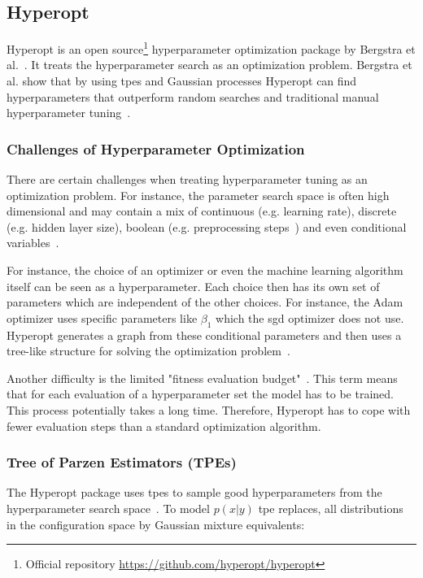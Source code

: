 \subsection{Hyperopt}

Hyperopt is an open source\footnote{Official repository \url{https://github.com/hyperopt/hyperopt}} hyperparameter optimization package by Bergstra et al.~\cite{Bergstra2013a}. It treats the hyperparameter search as an optimization problem. Bergstra et al. show that by using \glspl{tpe} and Gaussian processes Hyperopt can find hyperparameters that outperform random searches and traditional manual hyperparameter tuning~\cite{Bergstra2011}.




\subsubsection*{Challenges of Hyperparameter Optimization}

There are certain challenges when treating hyperparameter tuning as an optimization problem. For instance, the parameter search space is often high dimensional and may contain a mix of continuous {(e.g. learning rate)}, discrete {(e.g. hidden layer size)}, boolean {(e.g. preprocessing steps~\cite{Hutter2009})} and even conditional variables~\cite{Bergstra2013}. 

For instance, the choice of an optimizer or even the machine learning algorithm itself can be seen as a hyperparameter. Each choice then has its own set of parameters which are independent of the other choices. For instance, the Adam optimizer uses specific parameters like $\beta_1$ which the \gls{sgd} optimizer does not use. Hyperopt generates a graph from these conditional parameters and then uses a tree-like structure for solving the optimization problem~\cite{Bergstra2011}.
\newline

Another difficulty is the limited "fitness evaluation budget"~\cite{Bergstra2011}. This term means that for each evaluation of a hyperparameter set the model has to be trained. This process potentially takes a long time. Therefore, Hyperopt has to cope with fewer evaluation steps than a standard optimization algorithm.

\subsubsection*{Tree of Parzen Estimators {(TPEs)}}
The Hyperopt package uses \glspl{tpe} to sample good hyperparameters from the hyperparameter search space~\cite{Bergstra2013a}. To model $p(x|y)$ \gls{tpe} replaces, all distributions in the configuration space by Gaussian mixture equivalents:

